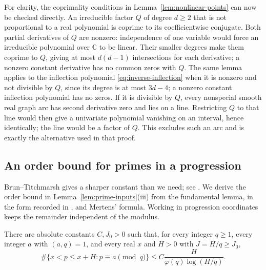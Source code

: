 For clarity, the coprimality conditions in
Lemma~\ref{lem:nonlinear-points} can now be checked directly.
An irreducible factor $Q$ of degree $d\ge2$ that is not proportional
to a real polynomial is coprime to its coefficientwise conjugate.
Both partial derivatives of $Q$ are nonzero: independence of one
variable would force an irreducible polynomial over $\mathbb C$ to
be linear.  Their smaller degrees make them coprime to $Q$, giving
at most $d(d-1)$ intersections for each derivative; a nonzero constant
derivative has no common zeros with $Q$.  The same lemma
applies to the inflection polynomial
\eqref{eq:inverse-inflection} when it is nonzero and not divisible
by $Q$, since its degree is at most $3d-4$; a nonzero constant
inflection polynomial has no zeros.  If it is divisible by $Q$,
every nonspecial smooth real graph arc has second derivative zero
and lies on a line.  Restricting $Q$ to that line would then give a
univariate polynomial vanishing on an interval, hence identically;
the line would be a factor of $Q$.  This excludes such an arc and
is exactly the alternative used in that proof.

\subsection{An order bound for primes in a progression}

Brun--Titchmarsh gives a sharper constant than we need; see
\cite[Theorem~1.4.4]{GranvilleSoundararajan2014}.  We derive the
order bound in Lemma~\ref{lem:prime-inputs}(iii) from the fundamental
lemma, in the form recorded in \cite[Lemma~2.8]{Sofos2023}, and
Mertens' formula.  Working in progression coordinates keeps the
remainder independent of the modulus.

\begin{lemma}\label{lem:elementary-brun-titchmarsh}
There are absolute constants $C,J_0>0$ such that, for every integer
$q\ge1$, every integer $a$ with $(a,q)=1$, and every real $x$ and
$H>0$ with $J=H/q\ge J_0$,
\[
 \#\{x<p\le x+H:p\equiv a\pmod q\}
   \le C\frac{H}{\varphi(q)\log(H/q)}.
\]
\end{lemma}

